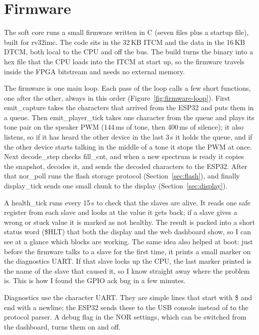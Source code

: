 \documentclass[a4paper,10pt]{article}
\begin{document}
\section{Firmware}
\label{sec:firmware}

The soft core runs a small firmware written in C (seven files plus a startup file), built
for rv32imc. The code sits in the 32\,KB ITCM and the data in the 16\,KB DTCM, both
local to the CPU and off the bus. The build turns the binary into a hex file that the CPU
loads into the ITCM at start up, so the firmware travels inside the FPGA bitstream and needs
no external memory.

The firmware is one main loop. Each pass of the loop calls a few short functions, one after
the other, always in this order (Figure~\ref{fig:firmware-loop}). First emit\_capture
takes the characters that arrived from the ESP32 and puts them in a queue. Then
emit\_player\_tick takes one character from the queue and plays its tone pair on the
speaker PWM (144\,ms of tone, then 400\,ms of silence); it also listens, so if it has heard
the other device in the last 3\,s it holds the queue, and if the other device starts talking
in the middle of a tone it stops the PWM at once. Next decode\_step checks
fill\_cnt, and when a new spectrum is ready it copies the snapshot, decodes it, and
sends the decoded characters to the ESP32. After that nor\_poll runs the flash
storage protocol (Section~\ref{sec:flash}), and finally display\_tick sends one small
chunk to the display (Section~\ref{sec:display}).

A health\_tick runs every 15\,s to check that the slaves are alive. It reads one safe
register from each slave and looks at the value it gets back; if a slave gives a wrong or
stuck value it is marked as not healthy. The result is packed into a short status word
(\$HLT) that both the display and the web dashboard show, so I can see at a glance
which blocks are working. The same idea also helped at boot: just before the firmware talks
to a slave for the first time, it prints a small marker on the diagnostics UART. If that
slave locks up the CPU, the last marker printed is the name of the slave that caused it, so I
know straight away where the problem is. This is how I found the GPIO ack bug in a few
minutes.

Diagnostics use the character UART. They are simple lines that start with \$ and end
with a newline; the ESP32 sends these to the USB console instead of to the protocol parser. A
debug flag in the NOR settings, which can be switched from the dashboard, turns them on and
off.
\end{document}
